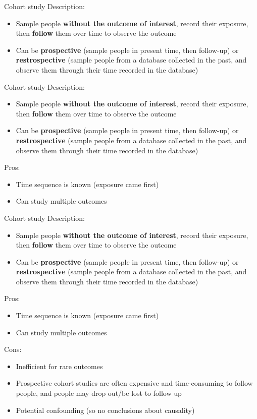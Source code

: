 \documentclass[10pt,t]{beamer}
\begin{document}
\begin{frame}{Cohort study}
Description:
\begin{itemize}
	\item Sample people \textbf{without the outcome of interest}, record their exposure, then \textbf{follow} them over time to observe the outcome
	\item Can be \textbf{prospective} (sample people in present time, then follow-up) or \textbf{restrospective} (sample people from a database collected in the past, and observe them through their time recorded in the database)
\end{itemize}
\end{frame}

\begin{frame}{Cohort study}
Description:
\begin{itemize}
	\item Sample people \textbf{without the outcome of interest}, record their exposure, then \textbf{follow} them over time to observe the outcome
	\item Can be \textbf{prospective} (sample people in present time, then follow-up) or \textbf{restrospective} (sample people from a database collected in the past, and observe them through their time recorded in the database)
\end{itemize}
Pros:
\begin{itemize}
	\item Time sequence is known (exposure came first)
	\item Can study multiple outcomes 
\end{itemize}
\end{frame}

\begin{frame}{Cohort study}
Description:
\begin{itemize}
	\item Sample people \textbf{without the outcome of interest}, record their exposure, then \textbf{follow} them over time to observe the outcome
	\item Can be \textbf{prospective} (sample people in present time, then follow-up) or \textbf{restrospective} (sample people from a database collected in the past, and observe them through their time recorded in the database)
\end{itemize}
Pros:
\begin{itemize}
	\item Time sequence is known (exposure came first)
	\item Can study multiple outcomes 
\end{itemize}
Cons:
\begin{itemize}
	\item Inefficient for rare outcomes
	\item Prospective cohort studies are often expensive and time-consuming to follow people, and people may drop out/be lost to follow up
	\item Potential confounding (so no conclusions about causality)
\end{itemize}
\end{frame}
\end{document}
